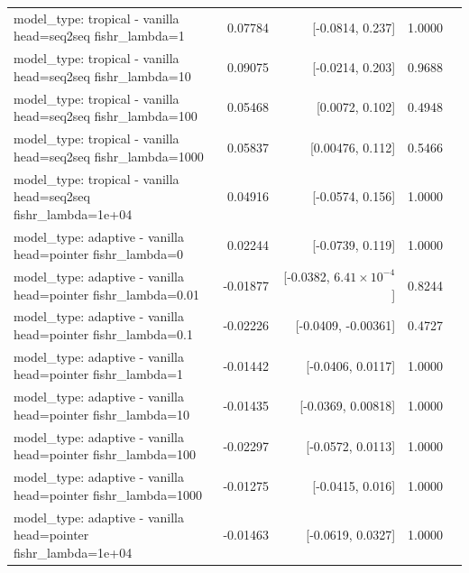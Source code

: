 \documentclass[10pt]{article}
\makeatletter
\newcommand{\stackcell}[1]{\begin{tabular}[t]{@{}l@{}}#1\end{tabular}}
\makeatother
\begin{document}
{\begin{longtable}{lrrrl}
\stackcell{model\_type: tropical - vanilla\\\footnotesize head=seq2seq fishr\_lambda=1 } & 0.07784 & [-0.0814, 0.237] & 1.0000 & \\
\stackcell{model\_type: tropical - vanilla\\\footnotesize head=seq2seq fishr\_lambda=10 } & 0.09075 & [-0.0214, 0.203] & 0.9688 & \\
\stackcell{model\_type: tropical - vanilla\\\footnotesize head=seq2seq fishr\_lambda=100 } & 0.05468 & [0.0072, 0.102] & 0.4948 & \\
\stackcell{model\_type: tropical - vanilla\\\footnotesize head=seq2seq fishr\_lambda=1000 } & 0.05837 & [0.00476, 0.112] & 0.5466 & \\
\stackcell{model\_type: tropical - vanilla\\\footnotesize head=seq2seq fishr\_lambda=1e+04 } & 0.04916 & [-0.0574, 0.156] & 1.0000 & \\
\stackcell{model\_type: adaptive - vanilla\\\footnotesize head=pointer fishr\_lambda=0 } & 0.02244 & [-0.0739, 0.119] & 1.0000 & \\
\stackcell{model\_type: adaptive - vanilla\\\footnotesize head=pointer fishr\_lambda=0.01 } & -0.01877 & [-0.0382, $6.41\times10^{-4}$] & 0.8244 & \\
\stackcell{model\_type: adaptive - vanilla\\\footnotesize head=pointer fishr\_lambda=0.1 } & -0.02226 & [-0.0409, -0.00361] & 0.4727 & \\
\stackcell{model\_type: adaptive - vanilla\\\footnotesize head=pointer fishr\_lambda=1 } & -0.01442 & [-0.0406, 0.0117] & 1.0000 & \\
\stackcell{model\_type: adaptive - vanilla\\\footnotesize head=pointer fishr\_lambda=10 } & -0.01435 & [-0.0369, 0.00818] & 1.0000 & \\
\stackcell{model\_type: adaptive - vanilla\\\footnotesize head=pointer fishr\_lambda=100 } & -0.02297 & [-0.0572, 0.0113] & 1.0000 & \\
\stackcell{model\_type: adaptive - vanilla\\\footnotesize head=pointer fishr\_lambda=1000 } & -0.01275 & [-0.0415, 0.016] & 1.0000 & \\
\stackcell{model\_type: adaptive - vanilla\\\footnotesize head=pointer fishr\_lambda=1e+04 } & -0.01463 & [-0.0619, 0.0327] & 1.0000 & \\

\end{longtable}}
\end{document}
